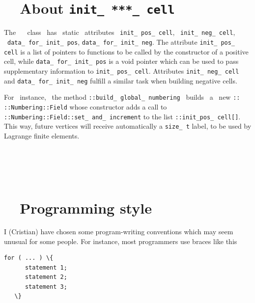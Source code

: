 \section{~~About {\tt init\_\,***\_\,cell}}\label{\numb section 11.\numb parag 10}

The \ {\small\tt{}} \ class \ has \ static \ attributes \ {\small\tt init\_\,pos\_\,cell},
\ {\small\tt init\_\,neg\_\,cell}, \ {\small\tt data\_\,for\_\,init\_\,pos},
{\small\tt data\_\,for\_\,init\_\,neg}.
The attribute {\small\tt init\_\,pos\_\,cell} is a list of pointers to functions to be called by
the constructor of a positive cell, while {\small\tt data\_\,for\_\,init\_\,pos} is a void pointer
which can be used to pass supplementary information to {\small\tt init\_\,pos\_\,cell}.
Attributes {\small\tt init\_\,neg\_\,cell} and {\small\tt data\_\,for\_\,init\_\,neg} fulfill
a similar task when building negative cells.

For \ instance, \ the method {\small\tt{}::build\_\,global\_\,numbering}
\ builds \ a \ new {\small\tt{}:: ::Numbering::Field} whose constructor
adds a call to {\small\tt{}::Numbering::Field::set\_\,and\_\,increment} to
the list {\small\tt{}::init\_\;pos\_\,cell[]}.
This way, future vertices will receive automatically a {\small\tt size\_\,t} label, to be used
by Lagrange finite elements.


\section{~~\cinza{[empty]}}\label{\numb section 11.\numb parag 11}


\section{~~Programming style}\label{\numb section 11.\numb parag 12}

I (Cristian) have chosen some program-writing conventions which may seem unusual for some people.
For instance, most programmers use braces like this

\begin{Verbatim}[commandchars=\\\{\},formatcom=\small\tt,baselinestretch=0.94]
   for ( ... ) \{
      statement 1;
      statement 2;
      statement 3;
   \}
\end{Verbatim}

